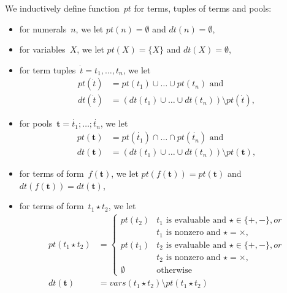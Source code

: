 \documentclass{article}
\newcommand{\pool}[1]{\boldsymbol{#1}}
\newcommand{\tuple}[1]{\dot{#1}}
\newcommand{\set}[1]{\{#1\}}
\newcommand\Provide{\mathit{pt}}
\newcommand\Depend{\mathit{dt}}
\begin{document}
	We inductively define function~$\Provide$ for terms, tuples of terms and pools:
	\begin{itemize}
		\item
			for numerals~$n$, we let
			$\Provide(n) = \emptyset$ and $\Depend(n) = \emptyset$,
		\item
			for variables~$X$, we let
			$\Provide(X) = \set{X}$ and $\Depend(X) = \emptyset$,
		\item
			for term tuples~$\tuple{t} = t_1,\dots,t_n$, we let
			\begin{align*}
				\Provide(\tuple{t}) &= \Provide(t_1) \cup \dots \cup \Provide(t_n)\text{\ and} \\
				\Depend(\tuple{t}) &= (\Depend(t_1) \cup \dots \cup \Depend(t_n)) \setminus \Provide(\tuple{t}),
			\end{align*}
		\item
			for pools~$\pool{t} = \tuple{t_1};\dots;\tuple{t_n}$, we let
			\begin{align*}
				\Provide(\pool{t}) &= \Provide(\tuple{t_1}) \cap \dots \cap \Provide(\tuple{t_n})\text{\ and} \\
				\Depend(\pool{t}) &= (\Depend(t_1) \cup \dots \cup \Depend(t_n)) \setminus \Provide(\pool{t}),
			\end{align*}
		\item
			for terms of form~$f(\pool{t})$, we let
			$\Provide(f(\pool{t})) = \Provide(\pool{t})$ and $\Depend(f(\pool{t})) = \Depend(\pool{t})$,
		\item
			for terms of form~$t_1 \star t_2$, we let
				\begin{align*}
				\Provide(t_1 \star t_2) &= \begin{cases}
					\Provide(t_2) & \text{$t_1$ is evaluable and ${\star} \in \set{{+}, {-}}$}, or\\
					              & \text{$t_1$ is nonzero and ${\star} = {\times}$,}\\
					\Provide(t_1) & \text{$t_2$ is evaluable and ${\star} \in \set{{+}, {-}}$}, or\\
					              & \text{$t_2$ is nonzero and ${\star} = {\times}$,}\\
					\emptyset & \text{otherwise}
				\end{cases}\\
				\Depend(\pool{t}) &= vars(t_1 \star t_2) \setminus \Provide(t_1 \star t_2)
				\end{align*}
	\end{itemize}
\end{document}

